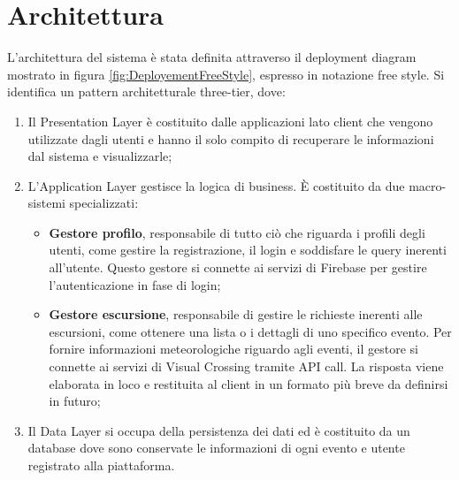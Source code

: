 \section{Architettura}

L'architettura del sistema è stata definita attraverso il deployment diagram mostrato in figura \ref{fig:DeployementFreeStyle}, espresso in notazione free style.
Si identifica un pattern architetturale three-tier, dove:
\begin{enumerate}
\item Il Presentation Layer è costituito dalle applicazioni lato client che vengono utilizzate dagli utenti e hanno il solo compito di recuperare le informazioni dal sistema e visualizzarle;
\item L'Application Layer gestisce la logica di business. È costituito da due macro-sistemi specializzati:
\begin{itemize}
    \item \textbf{Gestore profilo}, responsabile di tutto ciò che riguarda i profili degli utenti, come gestire la registrazione, il login
    e soddisfare le query inerenti all'utente. Questo gestore si connette ai servizi di Firebase per gestire l'autenticazione in fase di login;
    \item \textbf{Gestore escursione}, responsabile di gestire le richieste inerenti alle escursioni, come ottenere una lista o i dettagli di uno specifico
    evento. Per fornire informazioni meteorologiche riguardo agli eventi, il gestore si connette ai servizi di Visual Crossing tramite API call. La risposta viene elaborata
    in loco e restituita al client in un formato più breve da definirsi in futuro;
\end{itemize}
\item Il Data Layer si occupa della persistenza dei dati ed è costituito da un database dove sono conservate le informazioni di ogni evento e utente registrato alla 
piattaforma.
\end{enumerate}

